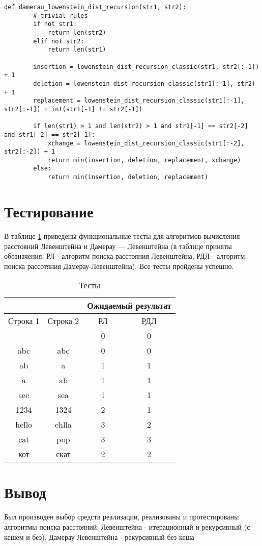 \begin{lstlisting}[caption=Функция рекурсивного алгоритма поиска расстояния Дамерау-Левенштейна,
	label={dlev_recursion}]
	def damerau_lowenstein_dist_recursion(str1, str2):
		# trivial rules
		if not str1:
			return len(str2)
		elif not str2:
			return len(str1)
		
		insertion = lowenstein_dist_recursion_classic(str1, str2[:-1]) + 1
		deletion = lowenstein_dist_recursion_classic(str1[:-1], str2) + 1
		replacement = lowenstein_dist_recursion_classic(str1[:-1], str2[:-1]) + int(str1[-1] != str2[-1])
		
		if len(str1) > 1 and len(str2) > 1 and str1[-1] == str2[-2] and str1[-2] == str2[-1]:
			xchange = lowenstein_dist_recursion_classic(str1[:-2], str2[:-2]) + 1
			return min(insertion, deletion, replacement, xchange)
		else:
			return min(insertion, deletion, replacement)
\end{lstlisting}

\section{Тестирование}

В таблице \ref{test} приведены функциональные тесты для алгоритмов вычисления расстояний Левенштейна и Дамерау — Левенштейна (в таблице приняты обозначения: РЛ - алгоритм поиска расстояния Левенштейна, РДЛ - алгоритм поиска рассотяния Дамерау-Левенштейна). Все тесты пройдены успешно.

\begin{table}[h]
	\begin{center}
		\caption{\label{test} Тесты}
		\begin{tabular}{|c|c|c|c|}
			\hline
			&                    & \multicolumn{2}{c|}{\bfseries Ожидаемый результат}    \\ \cline{3-4}\hline
			Строка 1& Строка 2 & РЛ & РДЛ \\ [0.5ex] 
			\hline
			 &  & 0 & 0\\
			\hline
			abc & abc & 0 & 0\\
			\hline
			ab & a & 1 & 1\\
			\hline
			a & ab & 1 & 1\\
			\hline
			see & sea & 1 & 1\\
			\hline
			1234 & 1324 & 2 & 1\\
			\hline
			hello & ehlla & 3 & 2\\
			\hline
			cat & pop & 3 & 3\\
			\hline
			кот & скат & 2 & 2\\
			\hline
		\end{tabular}
	\end{center}
\end{table}


\section*{Вывод}

Был производен выбор средств реализации, реализованы и протестированы алгоритмы поиска расстояний: Левенштейна - итерационный и рекурсивный (с кешем и без), Дамерау-Левенштейна - рекурсивный без кеша

